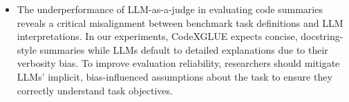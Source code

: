 \begin{enumerate}
\begin{itemize}
        \item The underperformance of LLM-as-a-judge in evaluating code summaries reveals a critical misalignment between benchmark task definitions and LLM interpretations. In our experiments, CodeXGLUE expects concise, docstring-style summaries while LLMs default to detailed explanations due to their verbosity bias. To improve evaluation reliability, researchers should mitigate LLMs' implicit, bias-influenced assumptions about the task to ensure they correctly understand task objectives.
        
    \end{itemize}
\end{enumerate}



